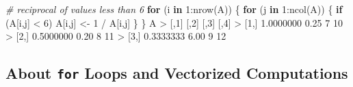 \documentclass[
]{book}
\newenvironment{Shaded}{\begin{snugshade}}{\end{snugshade}}
\newcommand{\CommentTok}[1]{\textcolor[rgb]{0.56,0.35,0.01}{\textit{#1}}}
\newcommand{\ControlFlowTok}[1]{\textcolor[rgb]{0.13,0.29,0.53}{\textbf{#1}}}
\newcommand{\DecValTok}[1]{\textcolor[rgb]{0.00,0.00,0.81}{#1}}
\newcommand{\FloatTok}[1]{\textcolor[rgb]{0.00,0.00,0.81}{#1}}
\newcommand{\FunctionTok}[1]{\textcolor[rgb]{0.00,0.00,0.00}{#1}}
\newcommand{\NormalTok}[1]{#1}
\newcommand{\OtherTok}[1]{\textcolor[rgb]{0.56,0.35,0.01}{#1}}
\newcommand{\SpecialCharTok}[1]{\textcolor[rgb]{0.00,0.00,0.00}{#1}}
\begin{document}
\begin{Shaded}
\begin{Highlighting}[]
\CommentTok{\# reciprocal of values less than 6}
\ControlFlowTok{for}\NormalTok{ (i }\ControlFlowTok{in} \DecValTok{1}\SpecialCharTok{:}\FunctionTok{nrow}\NormalTok{(A)) \{ }
  \ControlFlowTok{for}\NormalTok{ (j }\ControlFlowTok{in} \DecValTok{1}\SpecialCharTok{:}\FunctionTok{ncol}\NormalTok{(A)) \{}
    \ControlFlowTok{if}\NormalTok{ (A[i,j] }\SpecialCharTok{\textless{}} \DecValTok{6}\NormalTok{) A[i,j] }\OtherTok{\textless{}{-}} \DecValTok{1} \SpecialCharTok{/}\NormalTok{ A[i,j] }
\NormalTok{  \}}
\NormalTok{\}}
\NormalTok{A}
\SpecialCharTok{\textgreater{}}\NormalTok{           [,}\DecValTok{1}\NormalTok{] [,}\DecValTok{2}\NormalTok{] [,}\DecValTok{3}\NormalTok{] [,}\DecValTok{4}\NormalTok{]}
\SpecialCharTok{\textgreater{}}\NormalTok{ [}\DecValTok{1}\NormalTok{,] }\FloatTok{1.0000000} \FloatTok{0.25}    \DecValTok{7}   \DecValTok{10}
\SpecialCharTok{\textgreater{}}\NormalTok{ [}\DecValTok{2}\NormalTok{,] }\FloatTok{0.5000000} \FloatTok{0.20}    \DecValTok{8}   \DecValTok{11}
\SpecialCharTok{\textgreater{}}\NormalTok{ [}\DecValTok{3}\NormalTok{,] }\FloatTok{0.3333333} \FloatTok{6.00}    \DecValTok{9}   \DecValTok{12}
\end{Highlighting}
\end{Shaded}

\hypertarget{about-for-loops-and-vectorized-computations}{%
\subsection{\texorpdfstring{About \texttt{for} Loops and Vectorized Computations}{About for Loops and Vectorized Computations}}\label{about-for-loops-and-vectorized-computations}}
\end{document}
